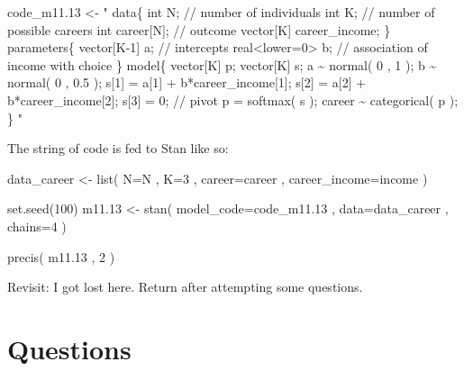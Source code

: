 \documentclass[
]{book}
\newenvironment{Shaded}{\begin{snugshade}}{\end{snugshade}}
\newcommand{\AttributeTok}[1]{\textcolor[rgb]{0.77,0.63,0.00}{#1}}
\newcommand{\DecValTok}[1]{\textcolor[rgb]{0.00,0.00,0.81}{#1}}
\newcommand{\FloatTok}[1]{\textcolor[rgb]{0.00,0.00,0.81}{#1}}
\newcommand{\FunctionTok}[1]{\textcolor[rgb]{0.00,0.00,0.00}{#1}}
\newcommand{\NormalTok}[1]{#1}
\newcommand{\OtherTok}[1]{\textcolor[rgb]{0.56,0.35,0.01}{#1}}
\newcommand{\StringTok}[1]{\textcolor[rgb]{0.31,0.60,0.02}{#1}}
\begin{document}
\begin{Shaded}
\begin{Highlighting}[]
\NormalTok{code\_m11}\FloatTok{.13} \OtherTok{\textless{}{-}} \StringTok{" data\{}
\StringTok{int N; // number of individuals }
\StringTok{int K; // number of possible careers }
\StringTok{int career[N]; // outcome }
\StringTok{vector[K] career\_income;}
\StringTok{\} }
\StringTok{parameters\{}
\StringTok{vector[K{-}1] a; // intercepts }
\StringTok{real\textless{}lower=0\textgreater{} b; // association of income with choice}
\StringTok{\} }
\StringTok{model\{}
\StringTok{vector[K] p; }
\StringTok{vector[K] s; }
\StringTok{a \textasciitilde{} normal( 0 , 1 ); }
\StringTok{b \textasciitilde{} normal( 0 , 0.5 ); }
\StringTok{s[1] = a[1] + b*career\_income[1]; }
\StringTok{s[2] = a[2] + b*career\_income[2]; }
\StringTok{s[3] = 0; // pivot }
\StringTok{p = softmax( s ); }
\StringTok{career \textasciitilde{} categorical( p );}
\StringTok{\}}
\StringTok{"}
\end{Highlighting}
\end{Shaded}

The string of code is fed to Stan like so:

\begin{Shaded}
\begin{Highlighting}[]
\NormalTok{data\_career }\OtherTok{\textless{}{-}} \FunctionTok{list}\NormalTok{( }\AttributeTok{N=}\NormalTok{N , }\AttributeTok{K=}\DecValTok{3}\NormalTok{ , }\AttributeTok{career=}\NormalTok{career , }\AttributeTok{career\_income=}\NormalTok{income ) }

\FunctionTok{set.seed}\NormalTok{(}\DecValTok{100}\NormalTok{)}
\NormalTok{m11}\FloatTok{.13} \OtherTok{\textless{}{-}} \FunctionTok{stan}\NormalTok{( }\AttributeTok{model\_code=}\NormalTok{code\_m11}\FloatTok{.13}\NormalTok{ , }\AttributeTok{data=}\NormalTok{data\_career , }\AttributeTok{chains=}\DecValTok{4}\NormalTok{ )}


\FunctionTok{precis}\NormalTok{( m11}\FloatTok{.13}\NormalTok{ , }\DecValTok{2}\NormalTok{ )}
\end{Highlighting}
\end{Shaded}

Revisit: I got lost here. Return after attempting some questions.

\hypertarget{questions-10}{%
\section{Questions}\label{questions-10}}
\end{document}
